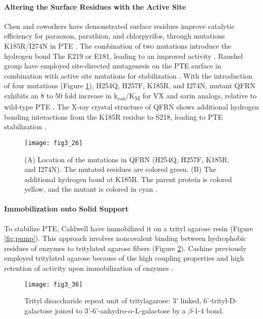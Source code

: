 \begin{refsection}
\paragraph{Altering the Surface Residues with the Active Site}
Chen and coworkers have demonstrated surface residues improve catalytic
efficiency for paraoxon, parathion, and chlorpyrifos, through mutations
K185R/I274N in PTE \cite{Mee-HieCho2006a}. The combination of two mutations
introduce the hydrogen bond The E219 or E181, leading to an improved activity
\cite{Mee-HieCho2006a}. Raushel group have employed site-directed mutagenesis
on the PTE surface in combination with active site mutations for stabilization
\cite{Tsai2012b}.  With the introduction of four mutations (Figure
\ref{fig:qfrn}), H254Q, H257F, K185R, and I274N, mutant QFRN exhibits an 8 to
50 fold increase in k\textsubscript{cat}/K\textsubscript{M} for VX and sarin
analogs, relative to wild-type PTE \cite{Tsai2012b}. The X-ray crystal
structure of QFRN shows additional hydrogen bonding interactions from the K185R
residue to S218, leading to PTE stabilization \cite{Tsai2012b}. 
\begin{figure}[htbp] \centering \texttt{[image: fig3\_26]}
    \caption[(A) Location of the mutations in QFRN (H254Q, H257F, K185R,
and I274N). The mutated residues are colored green. (B) The additional hydrogen
bond at K185R. The parent protein is colored yellow, and the mutant is colored
in cyan.] {(A) Location of the mutations in QFRN (H254Q, H257F, K185R, and
    I274N). The mutated residues are colored green. (B) The additional hydrogen
    bond at K185R. The parent protein is colored yellow, and the mutant is
    colored in cyan \cite{Tsai2012b}.} \label{fig:qfrn}
\end{figure}

\paragraph{Immobilization onto Solid Support}
To stabilize PTE, Caldwell  have immobilized it on a trityl
agarose resin \cite{Caldwell1991} (Figure \ref{fig:pump}). This approach
involves noncovalent binding between hydrophobic residues of enzymes to
tritylated agarose fibers (Figure \ref{fig:tri}). Cashine 
previously employed tritylated agarose because of the high coupling properties
and high retention of activity upon immobilization of enzymes
\cite{Cashion1982}. 
\begin{figure}[htbp] \centering \texttt{[image: fig3\_36]}
    \caption[Trityl disaccharide repeat unit of tritylagarose: 3\rq linked,
    6\rq-trityl-D-galactose joined to 3\rq-6\rq-anhydro-$\alpha$-L-galactose by
a $\beta$-1-4 bond.]{Trityl disaccharide repeat unit of tritylagarose: 3\rq
linked, 6\rq-trityl-D-galactose joined to
3\rq-6\rq-anhydro-$\alpha$-L-galactose by a $\beta$-1-4 bond.} \label{fig:tri}
\end{figure}


\end{refsection}
